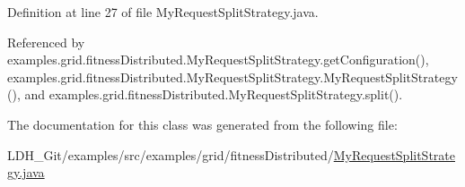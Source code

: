 Definition at line 27 of file My\-Request\-Split\-Strategy.\-java.



Referenced by examples.\-grid.\-fitness\-Distributed.\-My\-Request\-Split\-Strategy.\-get\-Configuration(), examples.\-grid.\-fitness\-Distributed.\-My\-Request\-Split\-Strategy.\-My\-Request\-Split\-Strategy(), and examples.\-grid.\-fitness\-Distributed.\-My\-Request\-Split\-Strategy.\-split().



The documentation for this class was generated from the following file\-:\begin{DoxyCompactItemize}
\item 
L\-D\-H\-\_\-\-Git/examples/src/examples/grid/fitness\-Distributed/\hyperlink{fitness_distributed_2_my_request_split_strategy_8java}{My\-Request\-Split\-Strategy.\-java}\end{DoxyCompactItemize}
